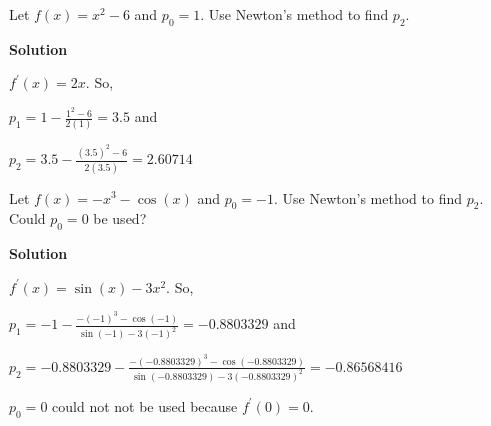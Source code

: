

\maketitle

\pagebreak

\begin{homeworkProblem}
    Let $f(x) = x^2 - 6$ and $p_0 = 1$. Use Newton's method to find $p_2$.\newline

    \textbf{Solution}\newline

    $f^{\prime}(x) = 2x$. So,\newline

    $p_1 = 1 - \frac{1^2 - 6}{2(1)} = 3.5$ and \newline

    $p_2 = 3.5 - \frac{(3.5)^2 - 6}{2(3.5)} = 2.60714$
\end{homeworkProblem}

\begin{homeworkProblem}
    Let $f(x) = -x^3 - \cos (x)$ and $p_0 = -1$. Use Newton's method to find $p_2$.
    Could $p_0 = 0$ be used?\newline

    \textbf{Solution}\newline

    $f^{\prime}(x) = \sin (x) - 3x^2$. So,\newline

    $p_1 = -1 - \frac{-(-1)^3 - \cos (-1)}{\sin (-1) - 3(-1)^2} = -0.8803329$ and \newline

    $p_2 = -0.8803329 - \frac{-(-0.8803329)^3 - \cos (-0.8803329)}{\sin (-0.8803329) - 3(-0.8803329)^2} = -0.86568416$\newline

    $p_0 = 0$ could not not be used because $f^{\prime}(0) = 0$.
\end{homeworkProblem}

